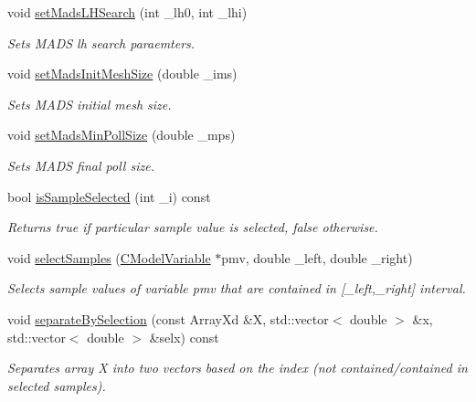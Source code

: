 \begin{DoxyCompactItemize}
void \hyperlink{class_go_s_u_m_1_1_c_container_a22a71fd1808b4e9bd0d4fb3a5b4ef0a7}{set\-Mads\-L\-H\-Search} (int \-\_\-lh0, int \-\_\-lhi)
\begin{DoxyCompactList}\small\item\em Sets M\-A\-D\-S lh search paraemters. \end{DoxyCompactList}\item 
void \hyperlink{class_go_s_u_m_1_1_c_container_ad552e7ea343fd95a5a0384ce3e8d18c3}{set\-Mads\-Init\-Mesh\-Size} (double \-\_\-ims)
\begin{DoxyCompactList}\small\item\em Sets M\-A\-D\-S initial mesh size. \end{DoxyCompactList}\item 
void \hyperlink{class_go_s_u_m_1_1_c_container_a80c18156be69abfea5ceabbda9a83260}{set\-Mads\-Min\-Poll\-Size} (double \-\_\-mps)
\begin{DoxyCompactList}\small\item\em Sets M\-A\-D\-S final poll size. \end{DoxyCompactList}\item 
bool \hyperlink{class_go_s_u_m_1_1_c_container_a49b85eedc6fd533dbf408befc649bd5e}{is\-Sample\-Selected} (int \-\_\-i) const 
\begin{DoxyCompactList}\small\item\em Returns true if particular sample value is selected, false otherwise. \end{DoxyCompactList}\item 
void \hyperlink{class_go_s_u_m_1_1_c_container_a39db61d98e387e4b70f0ed9321790690}{select\-Samples} (\hyperlink{class_go_s_u_m_1_1_c_model_variable}{C\-Model\-Variable} $\ast$pmv, double \-\_\-left, double \-\_\-right)
\begin{DoxyCompactList}\small\item\em Selects sample values of variable pmv that are contained in \mbox{[}\-\_\-left,\-\_\-right\mbox{]} interval. \end{DoxyCompactList}\item 
void \hyperlink{class_go_s_u_m_1_1_c_container_a14740007a92dcea3a3523216555356e4}{separate\-By\-Selection} (const Array\-Xd \&X, std\-::vector$<$ double $>$ \&x, std\-::vector$<$ double $>$ \&selx) const 
\begin{DoxyCompactList}\small\item\em Separates array X into two vectors based on the index (not contained/contained in selected samples). \end{DoxyCompactList}\item 

\end{DoxyCompactItemize}
